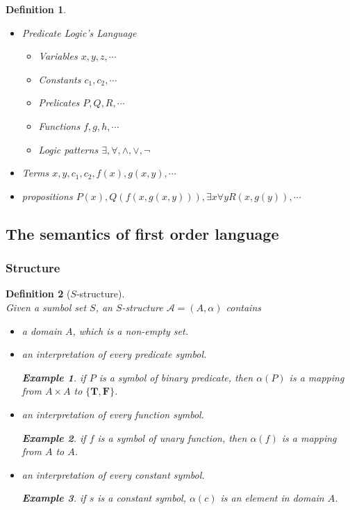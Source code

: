 \documentclass{ctexart}
\newcommand{\。}{．} %
\newenvironment{kuang3}{
    \begin{tcolorbox}[enhanced, breakable, colback=hlan!5!white, boxrule=0pt, frame hidden,
        borderline south={0.5mm}{0.1mm}{hlan}]
    }
    {\end{tcolorbox}}
\newenvironment{lvse}{
    \begin{tcolorbox}[enhanced, breakable, colback=qlv, boxrule=0pt, frame hidden,
        borderline west={0.7mm}{0.1mm}{slv}]
    }
    {\end{tcolorbox}}
\theoremstyle{t} %
\newtheorem{dyhj}{\color{slv} Definition}[subsection] %
\newtheorem{lthj}{\color{szi} Example}[subsection]
\newenvironment{dy}{\begin{lvse}\begin{dyhj}}{\end{dyhj}\end{lvse}}
\begin{document}
\begin{dy} \quad
    \begin{itemize}
        \item Predicate Logic's Language
        \begin{itemize}
            \item Variables $x, y, z, \cdots$
            \item Constants $c_1, c_2, \cdots$
            \item Prelicates $P, Q, R, \cdots$
            \item Functions $f, g, h, \cdots$
            \item Logic patterns $\exists, \forall, \land, \lor, \lnot$
        \end{itemize}
        \item Terms $x, y, c_1, c_2, f(x), g(x, y), \cdots$
        \item propositions $P(x), Q(f(x, g(x, y))), \exists x \forall y R(x, g(y)), \cdots$
    \end{itemize}
\end{dy}

\begin{kuang3}
    \subsection{The semantics of first order language}
\end{kuang3}

\subsubsection{Structure}

\begin{dy}[$S$-structure]\quad \\
    Given a sumbol set $S$, an $S$-structure $\mathcal{A} = \left(A, \alpha\right)$ contains
    \begin{itemize}
        \item a domain $A$, which is a non-empty set.
        \item an interpretation of every predicate symbol.
        \begin{lthj}
            if $P$ is a symbol of binary predicate, then $\alpha(P)$ is a mapping from $A \times A$ to $\{\mathbf{T}, \mathbf{F}\}$.
        \end{lthj}
        \item an interpretation of every function symbol.
        \begin{lthj}
            if $f$ is a symbol of unary function, then $\alpha(f)$ is a mapping from $A$ to $A$.
        \end{lthj}
        \item an interpretation of every constant symbol.
        \begin{lthj}
            if $s$ is a constant symbol, $\alpha(c)$ is an element in domain $A$.
        \end{lthj}
    \end{itemize}
\end{dy}
\end{document}
